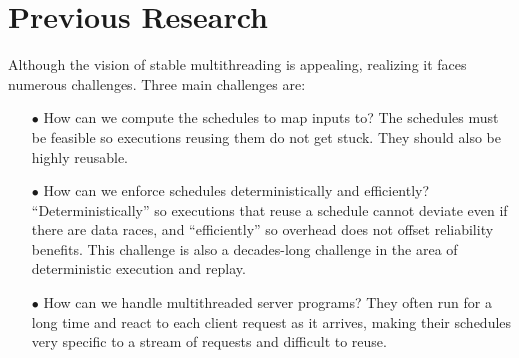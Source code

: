 \section{Previous Research} \label{sec:done}

Although the vision of stable multithreading is appealing, realizing it
faces numerous challenges.  Three main challenges are:

\begin{enumerate}

\item[$\bullet$] How can we compute the schedules to map inputs to?  The 
schedules
  must be feasible so executions reusing them do not get stuck.
  They should also be highly reusable.

\item[$\bullet$] How can we enforce schedules deterministically and
  efficiently?  ``Deterministically'' so executions that reuse a schedule
  cannot deviate even if there are data races, and ``efficiently'' so
  overhead does not offset reliability benefits.
  This challenge is also a decades-long challenge in the area of
  deterministic execution and replay.

\item[$\bullet$] How can we handle multithreaded server programs?  They often 
run for a
  long time and react to each client request as it arrives, making their
  schedules very specific to a stream of requests and difficult to reuse.

\end{enumerate}










